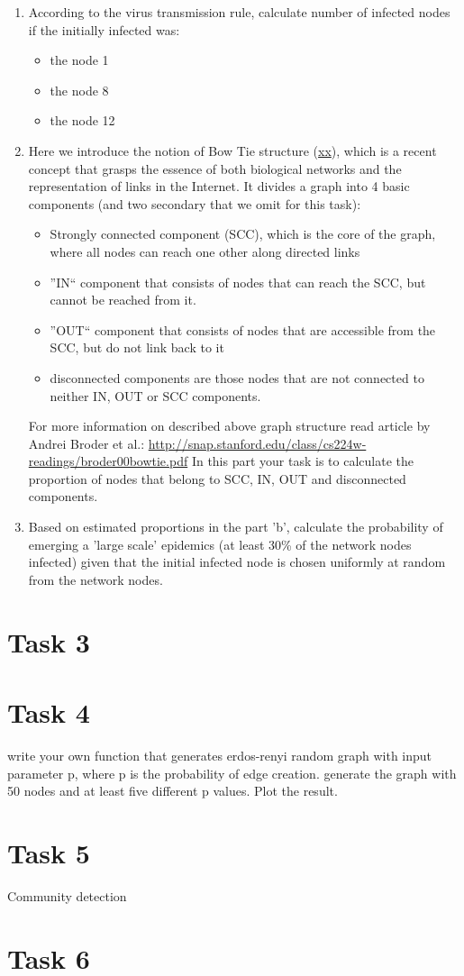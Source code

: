 \documentclass{article}
\begin{document}
\begin{enumerate}
\item According to the virus transmission rule, calculate number of infected nodes if the initially infected was:
\begin{itemize}
\item  the node 1
\item the node 8
\item the node 12
\end{itemize} 
\item Here we introduce the notion of Bow Tie structure (\url{xx}), which is a recent concept that grasps the essence of both biological networks and the representation of links in the Internet. It divides a graph into 4 basic components (and two secondary that we omit for this task):
\begin{itemize}
\item Strongly connected component (SCC), which is the core of the graph, where all nodes can reach one other along directed links
\item  ''IN`` component that consists of nodes that can reach the SCC, but cannot be reached from it.
\item ''OUT`` component that consists of nodes that are accessible from the SCC, but do not link back to it
\item disconnected components are those nodes that are not connected to neither IN, OUT or SCC components. 
\end{itemize}
For more information on described above graph structure read article by Andrei Broder et al.: \url{http://snap.stanford.edu/class/cs224w-readings/broder00bowtie.pdf}
In this part your task is to calculate the proportion of nodes that belong to SCC, IN, OUT and disconnected components.
\item Based on estimated proportions in the part 'b', calculate the probability of emerging a 'large scale' epidemics (at least 30\% of the network nodes infected) given that the initial infected node is chosen uniformly at random from the network nodes.
\end{enumerate}
\section*{Task 3}

\section*{Task 4}
write your own function that generates erdos-renyi random graph with input parameter p, where p is the probability of edge creation. generate the graph with 50 nodes and at least five different p values. Plot the result.  
\section*{Task 5}
Community detection
\section*{Task 6}


 
\end{document}
